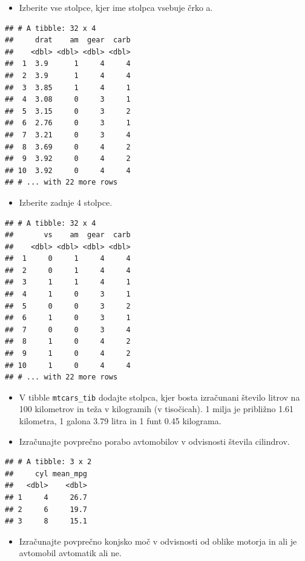\documentclass[
]{book}
\providecommand{\tightlist}{%
  \setlength{\itemsep}{0pt}\setlength{\parskip}{0pt}}
\begin{document}
\begin{enumerate}
  \begin{itemize}
  \tightlist
  \item
    Izberite vse stolpce, kjer ime stolpca vsebuje črko a.
  \end{itemize}

\begin{verbatim}
## # A tibble: 32 x 4
##     drat    am  gear  carb
##    <dbl> <dbl> <dbl> <dbl>
##  1  3.9      1     4     4
##  2  3.9      1     4     4
##  3  3.85     1     4     1
##  4  3.08     0     3     1
##  5  3.15     0     3     2
##  6  2.76     0     3     1
##  7  3.21     0     3     4
##  8  3.69     0     4     2
##  9  3.92     0     4     2
## 10  3.92     0     4     4
## # ... with 22 more rows
\end{verbatim}

  \begin{itemize}
  \tightlist
  \item
    Izberite zadnje 4 stolpce.
  \end{itemize}

\begin{verbatim}
## # A tibble: 32 x 4
##       vs    am  gear  carb
##    <dbl> <dbl> <dbl> <dbl>
##  1     0     1     4     4
##  2     0     1     4     4
##  3     1     1     4     1
##  4     1     0     3     1
##  5     0     0     3     2
##  6     1     0     3     1
##  7     0     0     3     4
##  8     1     0     4     2
##  9     1     0     4     2
## 10     1     0     4     4
## # ... with 22 more rows
\end{verbatim}

  \begin{itemize}
  \item
    V tibble \texttt{mtcars\_tib} dodajte stolpca, kjer bosta izračunani število litrov na 100 kilometrov in teža v kilogramih (v tisočicah). 1 milja je približno 1.61 kilometra, 1 galona 3.79 litra in 1 funt 0.45 kilograma.
  \item
    Izračunajte povprečno porabo avtomobilov v odvisnosti števila cilindrov.
  \end{itemize}

\begin{verbatim}
## # A tibble: 3 x 2
##     cyl mean_mpg
##   <dbl>    <dbl>
## 1     4     26.7
## 2     6     19.7
## 3     8     15.1
\end{verbatim}

  \begin{itemize}
  \tightlist
  \item
    Izračunajte povprečno konjsko moč v odvisnosti od oblike motorja in ali je avtomobil avtomatik ali ne.
  \end{itemize}


\end{enumerate}
\end{document}
